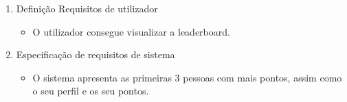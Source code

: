 \begin{enumerate}
    \item Definição Requisitos de utilizador
    \begin{itemize}
        \item O utilizador consegue visualizar a leaderboard.
    \end{itemize}
    \item Especificação de requisitos de sistema
    \begin{itemize}
        \item O sistema apresenta as primeiras 3 pessoas com mais pontos, assim como o seu perfil e os seu pontos.
    \end{itemize}
\end{enumerate}